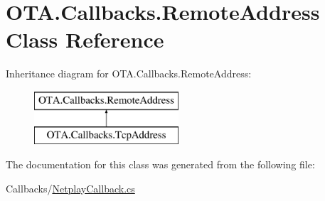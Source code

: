 \hypertarget{class_o_t_a_1_1_callbacks_1_1_remote_address}{}\section{O\+T\+A.\+Callbacks.\+Remote\+Address Class Reference}
\label{class_o_t_a_1_1_callbacks_1_1_remote_address}
Inheritance diagram for O\+T\+A.\+Callbacks.\+Remote\+Address\+:\begin{figure}[H]
\begin{center}
\leavevmode
\includegraphics[height=2.000000cm]{class_o_t_a_1_1_callbacks_1_1_remote_address}
\end{center}
\end{figure}


The documentation for this class was generated from the following file\+:\begin{DoxyCompactItemize}
\item 
Callbacks/\hyperlink{_netplay_callback_8cs}{Netplay\+Callback.\+cs}\end{DoxyCompactItemize}
